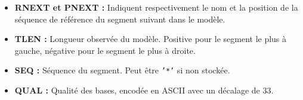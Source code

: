 \begin{itemize}
    \item \textbf{RNEXT et PNEXT :} Indiquent respectivement le nom et la position de la séquence de référence du segment suivant dans le modèle.

    \item \textbf{TLEN :} Longueur observée du modèle.
    Positive pour le segment le plus à gauche, négative pour le segment le plus à droite.

    \item \textbf{SEQ :} Séquence du segment.
    Peut être \texttt{'*'} si non stockée.

    \item \textbf{QUAL :} Qualité des bases, encodée en ASCII avec un décalage de 33.
\end{itemize}